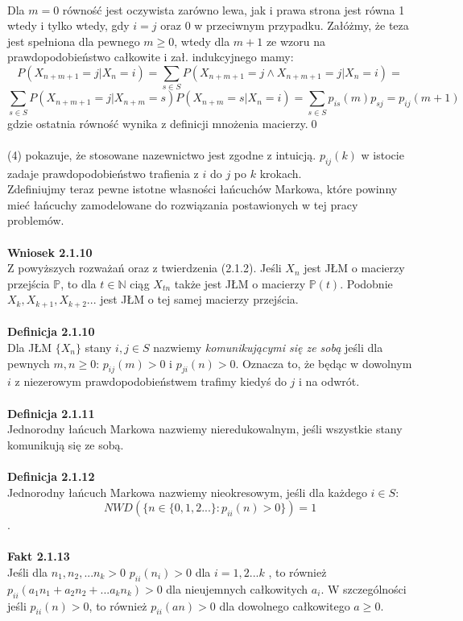 \documentclass[a4paper]{article}
\begin{document}
\\Dla $m=0$ równość jest oczywista zarówno lewa, jak i prawa strona jest równa 1 wtedy i tylko wtedy, gdy $i = j$ oraz 0 w przeciwnym przypadku. Załóżmy, że teza jest spełniona dla pewnego $m \geq 0$, wtedy dla $m+1$ ze wzoru na prawdopodobieństwo całkowite i zał. indukcyjnego mamy: $$P(X_{n+m+1}=j|X_n = i) = \sum\limits_{s \in S} P(X_{n+m+1}=j \land X_{n+m+1}=j |X_n = i) =$$  $$\sum\limits_{s \in S} P(X_{n+m+1}=j | X_{n+m}=s)P(X_{n+m}=s|X_n = i) = \sum\limits_{s \in S} p_{is}(m)p_{sj} = p_{ij}(m+1)$$
gdzie ostatnia równość wynika z definicji mnożenia macierzy.\qed
\\\\
(4) pokazuje, że stosowane nazewnictwo jest zgodne z intuicją. $p_{ij}(k)$ w istocie zadaje prawdopodobieństwo trafienia z $i$ do $j$ po $k$ krokach.
\\Zdefiniujmy teraz pewne istotne własności łańcuchów Markowa, które powinny mieć łańcuchy zamodelowane do rozwiązania postawionych w tej pracy problemów.
\\\\
\textbf{Wniosek 2.1.10}\\
Z powyższych rozważań oraz z twierdzenia (2.1.2). Jeśli $X_n$ jest JŁM o macierzy przejścia $\mathbb{P}$, to dla $t \in \mathbb{N}$ ciąg $X_{tn}$ także jest JŁM o macierzy $\mathbb{P}(t)$. Podobnie $X_{k}, X_{k+1}, X_{k+2}...$ jest JŁM o tej samej macierzy przejścia.
\\\\
\textbf{Definicja 2.1.10}\\
Dla JŁM $\{X_n\}$ stany $i,j \in S$ nazwiemy \textit{komunikującymi się ze sobą} jeśli dla pewnych $m,n \geq 0$: $p_{ij}(m) > 0$ i $p_{ji}(n) > 0$.
Oznacza to, że będąc w dowolnym $i$ z niezerowym prawdopodobieństwem trafimy kiedyś do $j$ i na odwrót.
\\\\
\textbf{Definicja 2.1.11}\\
Jednorodny łańcuch Markowa nazwiemy nieredukowalnym, jeśli wszystkie stany komunikują się ze sobą.
\\\\
\textbf{Definicja 2.1.12}\\
Jednorodny łańcuch Markowa nazwiemy nieokresowym, jeśli dla każdego $i \in S$: $$NWD(\{n \in \{0, 1, 2...\}:  p_{ii}(n) > 0\}) = 1$$.
\\\\
\textbf{Fakt 2.1.13}\\
Jeśli dla $n_1, n_2, ... n_k > 0$ $p_{ii}(n_i) > 0$ dla $i=1,2...k$ , to również $p_{ii}(a_1n_1 + a_2n_2 + ... a_kn_k) > 0$ dla nieujemnych całkowitych $a_i$. W szczególności jeśli $p_{ii}(n) > 0$, to również $p_{ii}(an) > 0$ dla dowolnego całkowitego $a \geq 0$.\\
\end{document}
